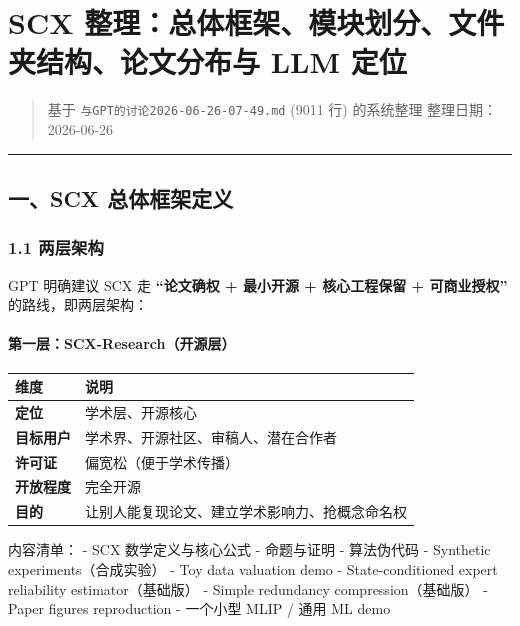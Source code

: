 \documentclass[
  12pt,
]{ctexart}
\author{SCX}
\date{2026}
\begin{document}
\section{SCX 整理：总体框架、模块划分、文件夹结构、论文分布与 LLM
定位}\label{scx-ux6574ux7406ux603bux4f53ux6846ux67b6ux6a21ux5757ux5212ux5206ux6587ux4ef6ux5939ux7ed3ux6784ux8bbaux6587ux5206ux5e03ux4e0e-llm-ux5b9aux4f4d}

\begin{quote}
基于 \texttt{与GPT的讨论2026-06-26-07-49.md} (9011 行) 的系统整理
整理日期：2026-06-26
\end{quote}

\begin{center}\rule{0.5\linewidth}{0.5pt}\end{center}

\subsection{一、SCX
总体框架定义}\label{ux4e00scx-ux603bux4f53ux6846ux67b6ux5b9aux4e49}

\subsubsection{1.1 两层架构}\label{ux4e24ux5c42ux67b6ux6784}

GPT 明确建议 SCX 走 \textbf{``论文确权 + 最小开源 + 核心工程保留 +
可商业授权''} 的路线，即两层架构：

\paragraph{第一层：SCX-Research（开源层）}\label{ux7b2cux4e00ux5c42scx-researchux5f00ux6e90ux5c42}

\begin{longtable}[]{@{}ll@{}}
\toprule\noalign{}
维度 & 说明 \\
\midrule\noalign{}
\endhead
\bottomrule\noalign{}
\endlastfoot
\textbf{定位} & 学术层、开源核心 \\
\textbf{目标用户} & 学术界、开源社区、审稿人、潜在合作者 \\
\textbf{许可证} & 偏宽松（便于学术传播） \\
\textbf{开放程度} & 完全开源 \\
\textbf{目的} & 让别人能复现论文、建立学术影响力、抢概念命名权 \\
\end{longtable}

内容清单： - SCX 数学定义与核心公式 - 命题与证明 - 算法伪代码 -
Synthetic experiments（合成实验） - Toy data valuation demo -
State-conditioned expert reliability estimator（基础版） - Simple
redundancy compression（基础版） - Paper figures reproduction - 一个小型
MLIP / 通用 ML demo
\end{document}
